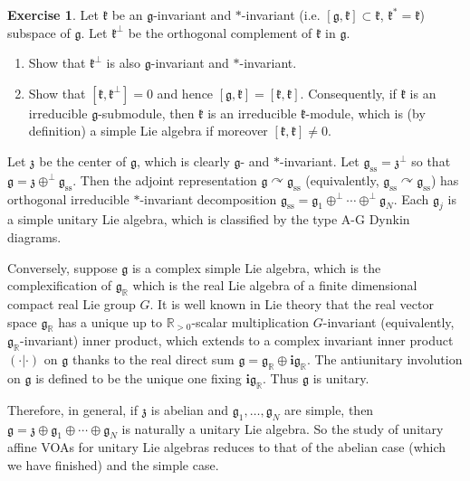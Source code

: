\documentclass[11pt,b5paper,notitlepage]{article}
\theoremstyle{definition}
\newtheorem{exe}[df]{Exercise}
\theoremstyle{plain}
\newcommand{\fk}{\mathfrak}
\newcommand{\gk}{\mathfrak g}
\newcommand{\zk}{\mathfrak z}
\newcommand{\im}{\mathbf{i}}
\newcommand{\Rbb}{\mathbb R}
\numberwithin{equation}{section}
\begin{document}
\begin{exe}
Let $\fk k$ be an $\gk$-invariant and $*$-invariant (i.e. $[\gk,\fk k]\subset\fk k$, $\fk k^*=\fk k$) subspace of $\gk$.  Let $\fk k^\perp$ be the orthogonal complement of $\fk k$ in $\gk$.
\begin{enumerate}
\item Show that $\fk k^\perp$ is also $\gk$-invariant and $*$-invariant.
\item Show that $[\fk k,\fk k^\perp]=0$ and hence $[\gk,\fk k]=[\fk k,\fk k]$. Consequently, if $\fk k$ is an irreducible $\gk$-submodule, then $\fk k$ is an irreducible $\fk k$-module, which is (by definition) a simple Lie algebra if moreover $[\fk k,\fk k]\neq 0$.
\end{enumerate}
\end{exe}


Let $\zk$ be the center of $\gk$, which is clearly $\gk$- and $*$-invariant. Let $\gk_{\mathrm{ss}}=\zk^\perp$ so that $\gk=\zk\oplus^\perp\gk_{\mathrm{ss}}$. Then the adjoint representation $\gk\curvearrowright\gk_{\mathrm{ss}}$ (equivalently, $\gk_{\mathrm{ss}}\curvearrowright\gk_{\mathrm{ss}}$) has orthogonal irreducible $*$-invariant decomposition $\gk_{\mathrm{ss}}=\gk_1\oplus^\perp\cdots\oplus^\perp\gk_N$. Each $\gk_j$ is a simple unitary Lie algebra, which is classified by the type A-G Dynkin diagrams.


Conversely, suppose $\gk$ is a complex simple Lie algebra, which is the complexification of $\gk_\Rbb$ which is the real Lie algebra of a finite dimensional compact real Lie group $G$. It is well known in Lie theory that the real vector space $\gk_\Rbb$ has a unique up to $\Rbb_{>0}$-scalar multiplication  $G$-invariant (equivalently, $\gk_\Rbb$-invariant) inner product, which extends to a complex invariant inner product $(\cdot|\cdot)$ on $\gk$ thanks to  the real direct sum $\gk=\gk_\Rbb\oplus\im\gk_\Rbb$. The antiunitary involution on $\gk$ is defined to be the unique one fixing $\im\gk_\Rbb$. Thus $\gk$ is unitary. 

Therefore, in general, if $\fk z$ is abelian and $\gk_1,\dots,\gk_N$ are simple, then $\gk=\fk z\oplus\gk_1\oplus\cdots\oplus\gk_N$ is naturally a unitary Lie algebra. So the study of unitary affine VOAs for unitary Lie algebras reduces to that of the abelian case (which we have finished) and the simple case.



\subsection{}
\end{document}
